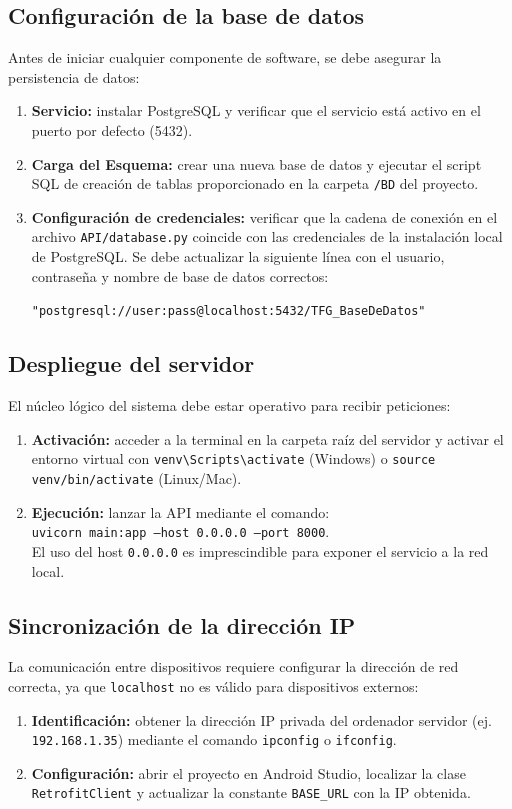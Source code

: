 \subsection{Configuración de la base de datos}
Antes de iniciar cualquier componente de software, se debe asegurar la persistencia de datos:
\begin{enumerate}
    \item \textbf{Servicio:} instalar PostgreSQL y verificar que el servicio está activo en el puerto por defecto (5432).
    \item \textbf{Carga del Esquema:} crear una nueva base de datos y ejecutar el script SQL de creación de tablas proporcionado en la carpeta \texttt{/BD} del proyecto.
    \item \textbf{Configuración de credenciales:} verificar que la cadena de conexión en el archivo \texttt{API/database.py} coincide con las credenciales de la instalación local de PostgreSQL. Se debe actualizar la siguiente línea con el usuario, contraseña y nombre de base de datos correctos:
\begin{center}
    \texttt{"postgresql://user:pass@localhost:5432/TFG\_BaseDeDatos"}
\end{center}
\end{enumerate}

\subsection{Despliegue del servidor}
El núcleo lógico del sistema debe estar operativo para recibir peticiones:
\begin{enumerate}
    \item \textbf{Activación:} acceder a la terminal en la carpeta raíz del servidor y activar el entorno virtual con \texttt{venv\textbackslash Scripts\textbackslash activate} (Windows) o \texttt{source venv/bin/activate} (Linux/Mac).
    \item \textbf{Ejecución:} lanzar la API mediante el comando: \\
    \texttt{uvicorn main:app --host 0.0.0.0 --port 8000}. \\
    El uso del host \texttt{0.0.0.0} es imprescindible para exponer el servicio a la red local.
\end{enumerate}

\subsection{Sincronización de la dirección IP}
La comunicación entre dispositivos requiere configurar la dirección de red correcta, ya que \texttt{localhost} no es válido para dispositivos externos:
\begin{enumerate}
    \item \textbf{Identificación:} obtener la dirección IP privada del ordenador servidor (ej. \texttt{192.168.1.35}) mediante el comando \texttt{ipconfig} o \texttt{ifconfig}.
    \item \textbf{Configuración:} abrir el proyecto en Android Studio, localizar la clase \texttt{RetrofitClient} y actualizar la constante \texttt{BASE\_URL} con la IP obtenida.
\end{enumerate}

